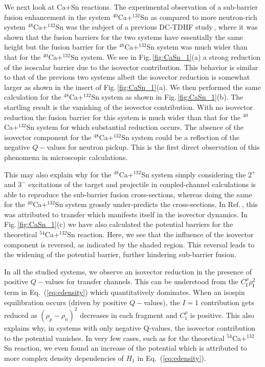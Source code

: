 \documentclass[aps,prl,twocolumn,superscriptaddress,floatfix,10pt]{revtex4-1}
\begin{document}
We next look at Ca$+$Sn reactions.
The experimental observation of a sub-barrier fusion enhancement in the system $^{40}$Ca+$^{132}$Sn
as compared to more neutron-rich system $^{48}$Ca+$^{132}$Sn was the subject of a previous DC-TDHF study\,\cite{oberacker2013},
where it was shown that the fusion barriers for the two systems have essentially the same height but the fusion barrier for
the $^{48}$Ca+$^{132}$Sn system was much wider than that for the $^{40}$Ca+$^{132}$Sn system.
We see in Fig.\,\ref{fig:CaSn_1}(a) a strong reduction of the isoscalar barrier due to the isovector contribution. This behavior is similar to that of the previous
two systems albeit the isovector reduction is somewhat larger as shown in the insert of
 Fig.\,\ref{fig:CaSn_1}(a).
We then performed the same calculation for the $^{48}$Ca+$^{132}$Sn system as shown in Fig.\,\ref{fig:CaSn_1}(b).
The startling result is the vanishing of the isovector contribution. With no isovector reduction the fusion barrier for this
system is much wider than that for the $^{40}$Ca+$^{132}$Sn system for which substantial reduction occurs.
The absence of the isovector component for the $^{48}$Ca+$^{132}$Sn system could be a reflection of the negative $Q-$values
for neutron pickup. This is the first direct observation of this phenomena in microscopic calculations.

This may also explain why for the $^{48}$Ca+$^{132}$Sn system simply considering the $2^+$ and
$3^-$ excitations of the target and projectile in coupled-channel calculations is able to
reproduce the sub-barrier fusion cross-sections, whereas doing the same for the $^{40}$Ca+$^{132}$Sn system grossly under-predicts the cross-sections.
In Ref.\,\cite{kolata2012}, this was attributed to transfer
which manifests itself in the isovector dynamics.
In Fig.\,\ref{fig:CaSn_1}(c) we have also calculated the potential barriers for the theoretical
$^{54}$Ca+$^{132}$Sn reaction. Here, we see that the influence of the isovector component
is reversed, as indicated by the shaded region. This reversal leads to the widening of
the potential barrier, further hindering sub-barrier fusion.

In all the studied systems, we observe an isovector reduction in the presence of  positive $Q-$values for transfer channels.
This can be understood from the $C_\mathrm{I}^{\rho}            \rho_\mathrm{I}^2$ term in Eq.~(\ref{eq:edensity})
which quantitatively dominates.
When an isospin equilibration occurs (driven by positive $Q-$values),
the $I=1$ contribution gets reduced as $(\rho_p-\rho_n)^2$ decreases
in each fragment and $C_1^\rho$ is positive.
This also explains why, in systems with only negative Q-values, the isovector contribution to the potential
vanishes.
In very few cases, such as for the theoretical $^{54}$Ca+$^{132}$Sn reaction,
we even found an increase of the
potential which is attributed to more complex density dependencies of $H_1$ in Eq.~(\ref{eq:edensity}).
\end{document}
